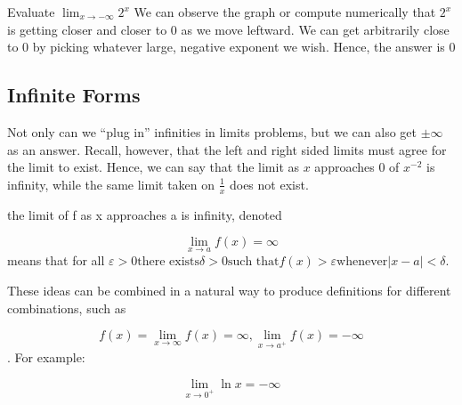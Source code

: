 \begin{example}
	\exProblem
Evaluate $\displaystyle \lim_{x \to -\infty}2^x$
	\exSolution
We can observe the graph or compute numerically that $2^x$ is getting closer
and closer to 0 as we move leftward.  We can get arbitrarily close to 0 by picking
whatever large, negative exponent we wish.  Hence, the answer is 0
\end{example}




\subsection{Infinite Forms}
Not only can we ``plug in'' infinities in limits problems, but we can also get
$\pm\infty$ as an answer.  Recall, however, that the left and right sided limits
must agree for the limit to exist.  Hence, we can say that the limit as $x$ 
approaches 0 of $x^{-2}$ is infinity, while the same limit taken on $\frac{1}{x}$
does not exist.


the limit of f as x approaches a is infinity, denoted

$$\lim_{x \to a} f(x) = \infty$$
means that for all $\varepsilon >0 \text{there exists}  \delta >0 \text{such that}  f(x) > \varepsilon \text{whenever}  |x - a| < \delta$.

These ideas can be combined in a natural way to produce definitions for different combinations, such as

$$f(x)=  \lim_{x \to \infty} f(x) = \infty, \lim_{x \to a^+}f(x) = -\infty$$.
For example:

$$ \lim_{x \to 0^+} \ln x = -\infty$$
